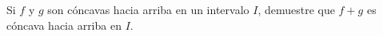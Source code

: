 \item Si $f$ y $g$ son cóncavas hacia arriba en un intervalo $I$, demuestre que $f + g$ es cóncava hacia arriba en $I$.
